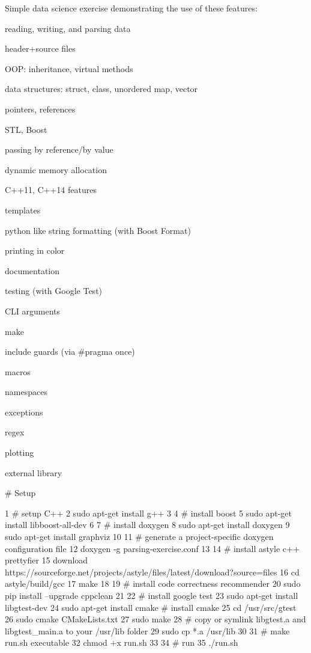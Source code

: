 Simple data science exercise demonstrating the use of these features\+:


\begin{DoxyItemize}
\item reading, writing, and parsing data
\item header+source files
\item O\+OP\+: inheritance, virtual methods
\item data structures\+: struct, class, unordered map, vector
\item pointers, references
\item S\+TL, Boost
\item passing by reference/by value
\item dynamic memory allocation
\item C++11, C++14 features
\item templates
\item python like string formatting (with Boost Format)
\item printing in color
\item documentation
\item testing (with Google Test)
\item C\+LI arguments
\item make
\item include guards (via \#pragma once)
\item macros
\item namespaces
\item exceptions
\item regex
\item plotting
\item external library
\end{DoxyItemize}

\# Setup 
\begin{DoxyCode}
1 # setup C++
2 sudo apt-get install g++
3 
4 # install boost
5 sudo apt-get install libboost-all-dev
6 
7 # install doxygen
8 sudo apt-get install doxygen
9 sudo apt-get install graphviz
10 
11 # generate a project-specific doxygen configuration file
12 doxygen -g parsing-exercise.conf
13 
14 # install astyle c++ prettyfier
15 download https://sourceforge.net/projects/astyle/files/latest/download?source=files
16 cd astyle/build/gcc
17 make
18 
19 # install code correctness recommender
20 sudo pip install --upgrade cppclean
21 
22 # install google test
23 sudo apt-get install libgtest-dev
24 sudo apt-get install cmake # install cmake
25 cd /usr/src/gtest
26 sudo cmake CMakeLists.txt
27 sudo make
28 # copy or symlink libgtest.a and libgtest\_main.a to your /usr/lib folder
29 sudo cp *.a /usr/lib
30 
31 # make run.sh executable
32 chmod +x run.sh
33 
34 # run
35 ./run.sh
\end{DoxyCode}


